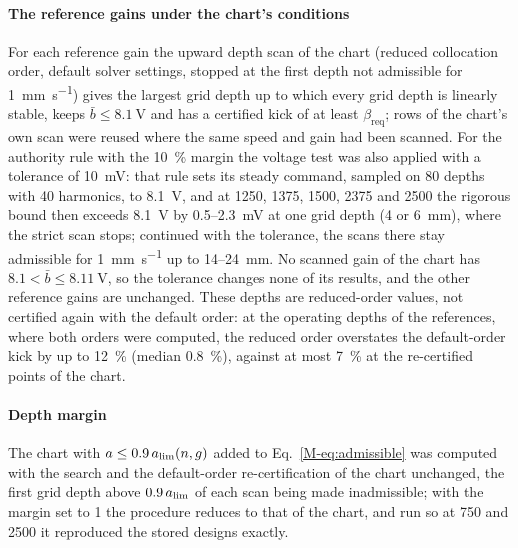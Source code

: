 \paragraph{The reference gains under the chart's conditions} For each reference gain the upward depth scan of the chart (reduced collocation order, default solver settings, stopped at the first depth not admissible for \SI{1}{\milli\metre\per\second}) gives the largest grid depth up to which every grid depth is linearly stable, keeps $\bar b\le\SI{8.1}{\volt}$ and has a certified kick of at least $\beta_{\mathrm{req}}$; rows of the chart's own scan were reused where the same speed and gain had been scanned. For the authority rule with the \SI{10}{\percent} margin the voltage test was also applied with a tolerance of \SI{10}{\milli\volt}: that rule sets its steady command, sampled on 80 depths with 40 harmonics, to \SI{8.1}{\volt}, and at 1250, 1375, 1500, 2375 and \SI{2500}{\rpm} the rigorous bound then exceeds \SI{8.1}{\volt} by 0.5--\SI{2.3}{\milli\volt} at one grid depth (4 or \SI{6}{\milli\metre}), where the strict scan stops; continued with the tolerance, the scans there stay admissible for \SI{1}{\milli\metre\per\second} up to 14--\SI{24}{\milli\metre}. No scanned gain of the chart has $8.1<\bar b\le\SI{8.11}{\volt}$, so the tolerance changes none of its results, and the other reference gains are unchanged. These depths are reduced-order values, not certified again with the default order: at the operating depths of the references, where both orders were computed, the reduced order overstates the default-order kick by up to \SI{12}{\percent} (median \SI{0.8}{\percent}), against at most \SI{7}{\percent} at the re-certified points of the chart.

\paragraph{Depth margin} The chart with $a\le0.9\,a_{\lim}(n,g)$ added to Eq.~\eqref{M-eq:admissible} was computed with the search and the default-order re-certification of the chart unchanged, the first grid depth above $0.9\,a_{\lim}$ of each scan being made inadmissible; with the margin set to 1 the procedure reduces to that of the chart, and run so at 750 and \SI{2500}{\rpm} it reproduced the stored designs exactly.

